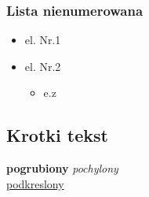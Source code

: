     \subsubsection{Lista nienumerowana}
        \begin{itemize}
            \item el. Nr.1
            \item el. Nr.2
            \begin{itemize}
                \item e.z
            \end{itemize}
        \end{itemize}
\subsection{Krotki tekst}
\textbf{pogrubiony} \textit{pochylony} \\
    \underline{ podkreslony}
